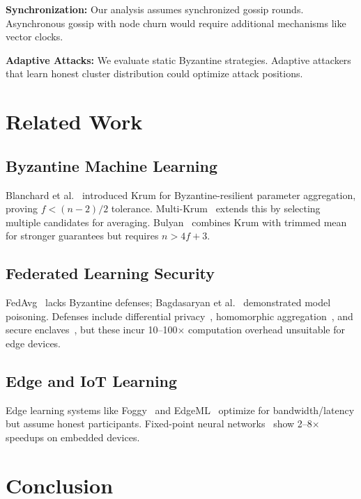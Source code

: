 \documentclass[conference,10pt]{IEEEtran}
\begin{document}
\textbf{Synchronization:} Our analysis assumes synchronized gossip rounds. Asynchronous gossip with node churn would require additional mechanisms like vector clocks.

\textbf{Adaptive Attacks:} We evaluate static Byzantine strategies. Adaptive attackers that learn honest cluster distribution could optimize attack positions.

\section{Related Work}
\label{sec:related}

\subsection{Byzantine Machine Learning}
Blanchard et al.~\cite{blanchard2017machine} introduced Krum for Byzantine-resilient parameter aggregation, proving $f<(n-2)/2$ tolerance. Multi-Krum~\cite{elmhamdi2018hidden} extends this by selecting multiple candidates for averaging. Bulyan~\cite{mhamdi2018hidden} combines Krum with trimmed mean for stronger guarantees but requires $n>4f+3$.

\subsection{Federated Learning Security}
FedAvg~\cite{mcmahan2017communication} lacks Byzantine defenses; Bagdasaryan et al.~\cite{bagdasaryan2020backdoor} demonstrated model poisoning. Defenses include differential privacy~\cite{abadi2016deep}, homomorphic aggregation~\cite{bonawitz2017practical}, and secure enclaves~\cite{mo2021ppfl}, but these incur 10--100$\times$ computation overhead unsuitable for edge devices.

\subsection{Edge and IoT Learning}
Edge learning systems like Foggy~\cite{he2020foggy} and EdgeML~\cite{kumar2017resource} optimize for bandwidth/latency but assume honest participants. Fixed-point neural networks~\cite{courbariaux2016binarized,zhou2016dorefa} show 2--8$\times$ speedups on embedded devices.

\section{Conclusion}
\label{sec:conclusion}
\end{document}
